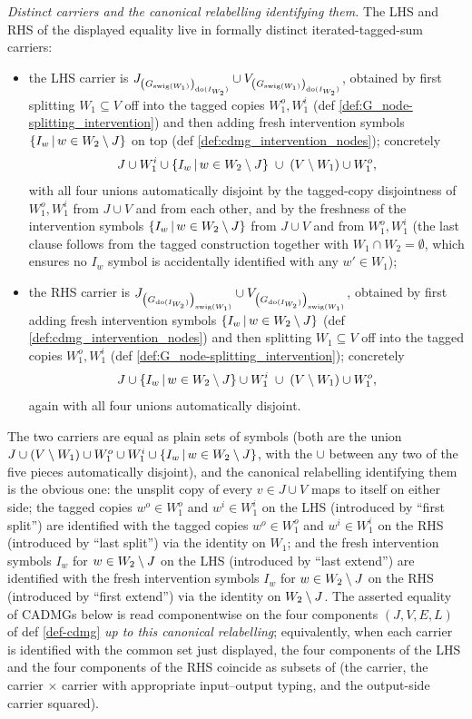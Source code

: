 \documentclass[main]{subfiles}
\begin{document}
\begin{Lem}
    \emph{Distinct carriers and the canonical relabelling identifying them.}
    The LHS and RHS of the displayed equality live in formally distinct iterated-tagged-sum carriers:
    \begin{itemize}
        \item the LHS carrier is $J_{\left ( G_{\mathrm{swig}(W_1)} \right )_{\operatorname{do}(I_{W_2})}} \cup V_{\left ( G_{\mathrm{swig}(W_1)} \right )_{\operatorname{do}(I_{W_2})}}$, obtained by first splitting $W_1 \subseteq V$ off into the tagged copies $W_1^o, W_1^i$ (def \ref{def:G_node-splitting_intervention}) and then adding fresh intervention symbols $\left \{ I_w \,\middle|\, w \in W_2 \setminus J \right \}$ on top (def \ref{def:cdmg_intervention_nodes}); concretely
              \[ J \cup W_1^i \cup \left \{ I_w \,\middle|\, w \in W_2 \setminus J \right \} \;\cup\; (V \setminus W_1) \cup W_1^o, \]
              with all four unions automatically disjoint by the tagged-copy disjointness of $W_1^o, W_1^i$ from $J \cup V$ and from each other, and by the freshness of the intervention symbols $\left \{ I_w \,\middle|\, w \in W_2 \setminus J \right \}$ from $J \cup V$ and from $W_1^o, W_1^i$ (the last clause follows from the tagged construction together with $W_1 \cap W_2 = \emptyset$, which ensures no $I_w$ symbol is accidentally identified with any $w' \in W_1$);
        \item the RHS carrier is $J_{\left ( G_{\operatorname{do}(I_{W_2})} \right )_{\mathrm{swig}(W_1)}} \cup V_{\left ( G_{\operatorname{do}(I_{W_2})} \right )_{\mathrm{swig}(W_1)}}$, obtained by first adding fresh intervention symbols $\left \{ I_w \,\middle|\, w \in W_2 \setminus J \right \}$ (def \ref{def:cdmg_intervention_nodes}) and then splitting $W_1 \subseteq V$ off into the tagged copies $W_1^o, W_1^i$ (def \ref{def:G_node-splitting_intervention}); concretely
              \[ J \cup \left \{ I_w \,\middle|\, w \in W_2 \setminus J \right \} \cup W_1^i \;\cup\; (V \setminus W_1) \cup W_1^o, \]
              again with all four unions automatically disjoint.
    \end{itemize}
    The two carriers are equal as plain sets of symbols (both are the union $J \cup (V \setminus W_1) \cup W_1^o \cup W_1^i \cup \left \{ I_w \,\middle|\, w \in W_2 \setminus J \right \}$, with the $\cup$ between any two of the five pieces automatically disjoint), and the canonical relabelling identifying them is the obvious one: the unsplit copy of every $v \in J \cup V$ maps to itself on either side; the tagged copies $w^o \in W_1^o$ and $w^i \in W_1^i$ on the LHS (introduced by ``first split'') are identified with the tagged copies $w^o \in W_1^o$ and $w^i \in W_1^i$ on the RHS (introduced by ``last split'') via the identity on $W_1$; and the fresh intervention symbols $I_w$ for $w \in W_2 \setminus J$ on the LHS (introduced by ``last extend'') are identified with the fresh intervention symbols $I_w$ for $w \in W_2 \setminus J$ on the RHS (introduced by ``first extend'') via the identity on $W_2 \setminus J$. The asserted equality of CADMGs below is read componentwise on the four components $(J, V, E, L)$ of def \ref{def-cdmg} \emph{up to this canonical relabelling}; equivalently, when each carrier is identified with the common set just displayed, the four components of the LHS and the four components of the RHS coincide as subsets of (the carrier, the carrier $\times$ carrier with appropriate input--output typing, and the output-side carrier squared).


\end{Lem}
\end{document}
